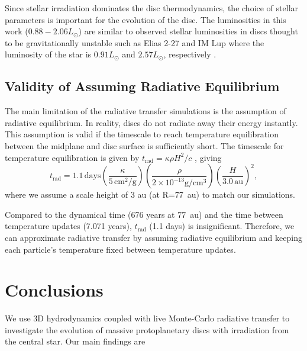 \documentclass[usenatbib]{mnras}
\begin{document}
Since stellar irradiation dominates the disc thermodynamics, the choice of stellar parameters is important for the evolution of the disc. The luminosities in this work ($0.88 - 2.06L_\odot$) are similar to observed stellar luminosities in discs thought to be gravitationally unstable such as Elias 2-27 and IM Lup \citep{2018bHuang} where the luminosity of the star is $0.91L_\odot$ and $2.57L_\odot$, respectively \citep{2018Andrews}.

\subsection{Validity of Assuming Radiative Equilibrium}

The main limitation of the radiative transfer simulations is the assumption of radiative equilibrium. In reality, discs do not radiate away their energy instantly. This assumption is valid if the timescale to reach temperature equilibration between the midplane and disc surface is sufficiently short. The timescale for temperature equilibration is given by $t_\text{rad} = \kappa \rho H^2/c$ \citep{1994Laughlin}, giving
\begin{equation}
    t_\text{rad} = 1.1\,\textrm{days} \left(\frac{\kappa}{5 \,\text{cm}^2/\text{g}}\right)  \left(\frac{\rho}{2\times10^{-13} \text{g}/\text{cm}^3} \right) \left(\frac{H}{3.0\,\textrm{au}}\right)^2,
\end{equation}
where we assume a scale height of 3 au (at R=77~au) to match our simulations. 

Compared to the dynamical time (676 years at 77~au) and the time between temperature updates (7.071 years), $t_\text{rad}$ (1.1 days) is insignificant. Therefore, we can approximate radiative transfer by assuming radiative equilibrium and keeping each particle's temperature fixed between temperature updates.

\section{Conclusions}

We use 3D hydrodynamics coupled with live Monte-Carlo radiative transfer to investigate the evolution of massive protoplanetary discs with irradiation from the central star. Our main findings are
\end{document}
